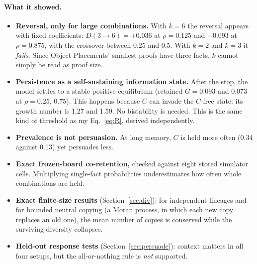 \documentclass[10pt,a4paper]{article}
\begin{document}
\paragraph{What it showed.}
\begin{itemize}
\item \textbf{Reversal, only for large combinations.} With $k=6$ the reversal appears with fixed coefficients:
  $D(3\to6)=+0.036$ at $\rho=0.125$ and $-0.093$ at $\rho=0.875$, with the crossover between 0.25 and 0.5.
  With $k=2$ and $k=3$ it \emph{fails}. Since Object Placements' smallest proofs have three facts, $k$ cannot simply be
  read as proof size.
\item \textbf{Persistence as a self-sustaining information state.} After the stop, the model settles to a stable
  positive equilibrium (retained $G=0.093$ and $0.073$ at $\rho=0.25$, $0.75$). This happens because $C$ can invade the
  $C$-free state: its growth number is 1.27 and 1.59. No bistability is needed. This is the same kind of threshold as
  my Eq.~\eqref{eq:R}, derived independently.
\item \textbf{Prevalence is not persuasion.} At long memory, $C$ is held more often (0.34 against 0.13) yet persuades
  less.
\item \textbf{Exact frozen-board co-retention,} checked against eight stored simulator cells. Multiplying single-fact
  probabilities underestimates how often whole combinations are held.
\item \textbf{Exact finite-size results} (Section~\ref{sec:div}): for independent lineages and for bounded neutral
  copying (a Moran process, in which each new copy replaces an old one), the mean number of copies is conserved while
  the surviving diversity collapses.
\item \textbf{Held-out response tests}
  (Section~\ref{sec:persuade}): context matters in all four setups, but the all-or-nothing rule is \emph{not}
  supported.
\end{itemize}
\end{document}
